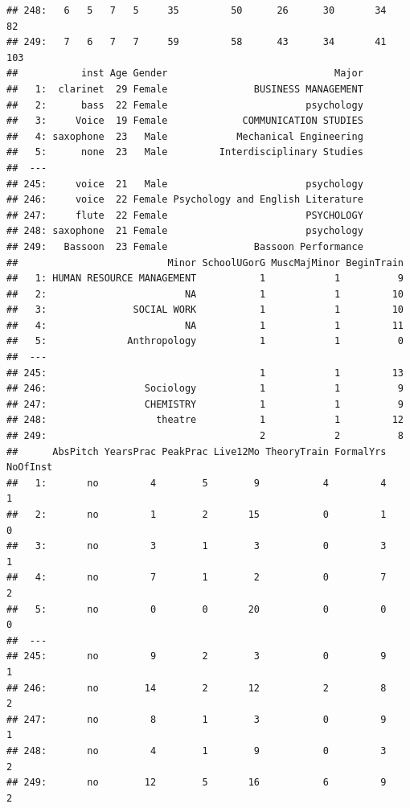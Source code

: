 \documentclass[]{book}
\theoremstyle{definition}
\theoremstyle{definition}
\theoremstyle{definition}
\theoremstyle{remark}
\begin{document}
\begin{verbatim}
## 248:   6   5   7   5     35         50      26      30       34      82
## 249:   7   6   7   7     59         58      43      34       41     103
##           inst Age Gender                             Major
##   1:  clarinet  29 Female               BUSINESS MANAGEMENT
##   2:      bass  22 Female                        psychology
##   3:     Voice  19 Female             COMMUNICATION STUDIES
##   4: saxophone  23   Male            Mechanical Engineering
##   5:      none  23   Male         Interdisciplinary Studies
##  ---                                                       
## 245:     voice  21   Male                        psychology
## 246:     voice  22 Female Psychology and English Literature
## 247:     flute  22 Female                        PSYCHOLOGY
## 248: saxophone  21 Female                        psychology
## 249:   Bassoon  23 Female               Bassoon Performance
##                          Minor SchoolUGorG MuscMajMinor BeginTrain
##   1: HUMAN RESOURCE MANAGEMENT           1            1          9
##   2:                        NA           1            1         10
##   3:               SOCIAL WORK           1            1         10
##   4:                        NA           1            1         11
##   5:              Anthropology           1            1          0
##  ---                                                              
## 245:                                     1            1         13
## 246:                 Sociology           1            1          9
## 247:                 CHEMISTRY           1            1          9
## 248:                   theatre           1            1         12
## 249:                                     2            2          8
##      AbsPitch YearsPrac PeakPrac Live12Mo TheoryTrain FormalYrs NoOfInst
##   1:       no         4        5        9           4         4        1
##   2:       no         1        2       15           0         1        0
##   3:       no         3        1        3           0         3        1
##   4:       no         7        1        2           0         7        2
##   5:       no         0        0       20           0         0        0
##  ---                                                                    
## 245:       no         9        2        3           0         9        1
## 246:       no        14        2       12           2         8        2
## 247:       no         8        1        3           0         9        1
## 248:       no         4        1        9           0         3        2
## 249:       no        12        5       16           6         9        2

\end{verbatim}
\end{document}
